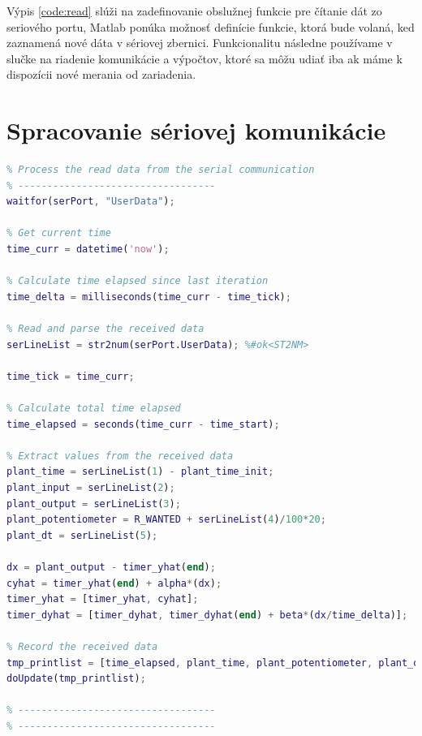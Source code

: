 \documentclass[a4paper, 10pt, ]{article}
\begin{document}
Výpis \ref{code:read} slúži na zadefinovanie obslužnej funkcie pre čítanie dát zo seriového portu, Matlab ponúka možnosť definície funkcie, ktorá bude volaná, ked zaznamená nové dáta v sériovej zbernici. Funkcionalitu následne používame v slučke na riadenie komunikácie a výpočtov, ktoré sa môžu udiať iba ak máme k dispozícii nové merania od zariadenia.

\section{Spracovanie sériovej komunikácie}
\begin{lstlisting}[caption=Spracovanie a zaznamenie dát zo sériovej komunikácie., label={code:record}, language=Matlab]
% ----------------------------------
% Process the read data from the serial communication
% ----------------------------------
waitfor(serPort, "UserData");

% Get current time
time_curr = datetime('now');

% Calculate time elapsed since last iteration
time_delta = milliseconds(time_curr - time_tick);

% Read and parse the received data
serLineList = str2num(serPort.UserData); %#ok<ST2NM>

time_tick = time_curr;

% Calculate total time elapsed
time_elapsed = seconds(time_curr - time_start);

% Extract values from the received data
plant_time = serLineList(1) - plant_time_init;
plant_input = serLineList(2);
plant_output = serLineList(3);
plant_potentiometer = R_WANTED + serLineList(4)/100*20;
plant_dt = serLineList(5);

dx = plant_output - timer_yhat(end);
cyhat = timer_yhat(end) + alpha*(dx);
timer_yhat = [timer_yhat, cyhat];
timer_dyhat = [timer_dyhat, timer_dyhat(end) + beta*(dx/time_delta)];

% Record the received data
tmp_printlist = [time_elapsed, plant_time, plant_potentiometer, plant_output, plant_input, plant_dt, time_delta];
doUpdate(tmp_printlist);

% ----------------------------------
% ----------------------------------
\end{lstlisting}
\end{document}
